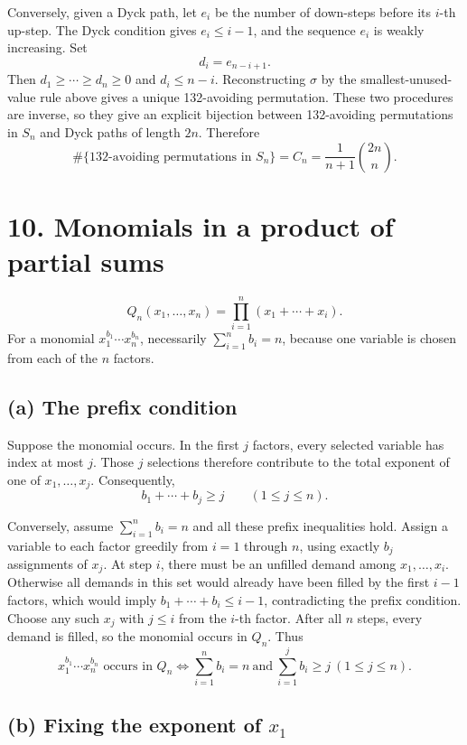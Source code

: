 \documentclass[11pt]{article}
\begin{document}
Conversely, given a Dyck path, let \(e_i\) be the number of down-steps before
its \(i\)-th up-step. The Dyck condition gives \(e_i\leq i-1\), and the
sequence \(e_i\) is weakly increasing. Set
\[
    d_i=e_{n-i+1}.
\]
Then \(d_1\geq\cdots\geq d_n\geq0\) and \(d_i\leq n-i\). Reconstructing
\(\sigma\) by the smallest-unused-value rule above gives a unique
132-avoiding permutation. These two procedures are inverse, so they give an
explicit bijection between 132-avoiding permutations in \(S_n\) and Dyck
paths of length \(2n\). Therefore
\[
\boxed{\#\{\text{132-avoiding permutations in }S_n\}
      =C_n=\frac{1}{n+1}\binom{2n}{n}.}
\]

\section*{10. Monomials in a product of partial sums}

\[
    Q_n(x_1,\ldots,x_n)=\prod_{i=1}^{n}(x_1+\cdots+x_i).
\]
For a monomial \(x_1^{b_1}\cdots x_n^{b_n}\), necessarily
\(\sum_{i=1}^n b_i=n\), because one variable is chosen from each of the
\(n\) factors.

\subsection*{(a) The prefix condition}

Suppose the monomial occurs. In the first \(j\) factors, every selected
variable has index at most \(j\). Those \(j\) selections therefore contribute
to the total exponent of one of \(x_1,\ldots,x_j\). Consequently,
\[
    b_1+\cdots+b_j\geq j
    \qquad(1\leq j\leq n).
\]

Conversely, assume \(\sum_{i=1}^n b_i=n\) and all these prefix inequalities
hold. Assign a variable to each factor greedily from \(i=1\) through \(n\),
using exactly \(b_j\) assignments of \(x_j\). At step \(i\), there must be an
unfilled demand among \(x_1,\ldots,x_i\). Otherwise all demands in this set
would already have been filled by the first \(i-1\) factors, which would imply
\(b_1+\cdots+b_i\leq i-1\), contradicting the prefix condition. Choose any
such \(x_j\) with \(j\leq i\) from the \(i\)-th factor. After all \(n\)
steps, every demand is filled, so the monomial occurs in \(Q_n\). Thus
\[
\boxed{
x_1^{b_1}\cdots x_n^{b_n}\text{ occurs in }Q_n
\iff
\sum_{i=1}^n b_i=n\ \text{and}\ 
\sum_{i=1}^j b_i\geq j\ (1\leq j\leq n).
}
\]

\subsection*{(b) Fixing the exponent of \(x_1\)}
\end{document}
